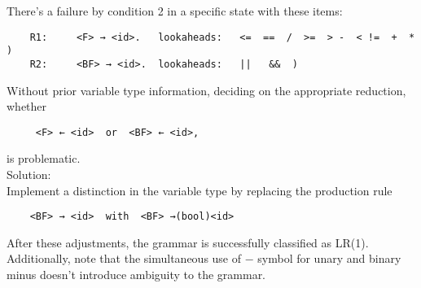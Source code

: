 \begin{enumerate}
    There’s a failure by condition 2 in a specific state with these items:
    \begin{verbatim}
    R1:		<F> → <id>.   lookaheads:   <=  ==  /  >=  > -  < !=  +  *  )
    R2:		<BF> → <id>.  lookaheads:   ||   &&  )
    \end{verbatim}
    Without prior variable type information, deciding on the appropriate reduction, whether
    \begin{verbatim}
     <F> ← <id>  or  <BF> ← <id>,
    \end{verbatim}
    is problematic.\\

    Solution: \\
    Implement a distinction in the variable type by replacing the production rule
    \begin{verbatim}
    <BF> → <id>  with  <BF> →(bool)<id>
    \end{verbatim}

    After these adjustments, the grammar is successfully classified as LR(1). Additionally, note that the simultaneous use of \(-\) symbol for unary and binary minus doesn’t introduce ambiguity to the grammar.
\end{enumerate}


